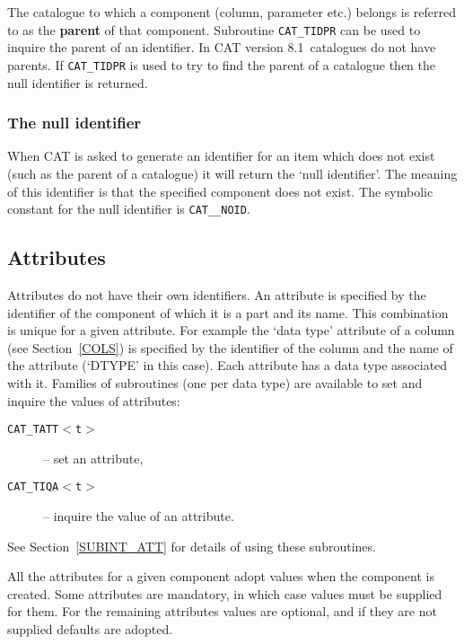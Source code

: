 \documentclass[11pt,twoside]{starlink}
\providecommand{\CATversion}{8.1~}
\begin{document}
The catalogue to which a component (column, parameter etc.) belongs is
referred to as the \textbf{parent} of that component. Subroutine \texttt{CAT\_TIDPR} can be used to inquire the parent of an identifier. In
CAT version \CATversion catalogues do not have parents. If \texttt{CAT\_TIDPR} is used to try to find the parent of a catalogue then the
null identifier is returned.

\subsubsection{The null identifier}

When CAT is asked to generate an identifier for an item which does not
exist (such as the parent of a catalogue) it will return the `null
identifier'. The meaning of this identifier is that the specified
component does not exist. The symbolic constant for the null identifier
is \texttt{CAT\_\_NOID}.


\subsection{Attributes}

Attributes do not have their own identifiers. An attribute is
specified by the identifier of the component of which it is a part and
its name. This combination is unique for a given attribute. For example
the `data type' attribute of a column (see Section~\ref{COLS}) is
specified by the identifier of the column and the name of the attribute
(`DTYPE' in this case). Each attribute has a data type associated with
it. Families of subroutines (one per data type) are available to set
and inquire the values of attributes:

\begin{description}

  \item[\texttt{CAT\_TATT$<$t$>$}] -- set an attribute,

  \item[\texttt{CAT\_TIQA$<$t$>$} ] -- inquire the value of an attribute.

\end{description}

See Section~\ref{SUBINT_ATT} for details of using these subroutines.

All the attributes for a given component adopt values when the component
is created. Some attributes are mandatory, in which case values must
be supplied for them. For the remaining attributes values are optional,
and if they are not supplied defaults are adopted.
\end{document}
